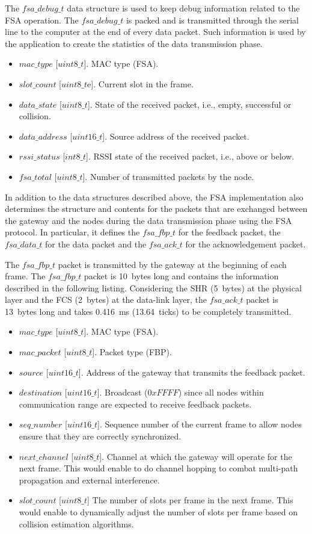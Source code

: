 The $fsa\_debug\_t$ data structure is used to keep debug information related to the FSA operation. The $fsa\_debug\_t$ is packed and is transmitted through the serial line to the computer at the end of every data packet. Such information is used by the application to create the statistics of the data transmission phase.
\begin{itemize}
\item $mac\_type$ [$uint8\_t$]. MAC type (FSA).
\item $slot\_count$ [$uint8\_t$e]. Current slot in the frame.
\item $data\_state$ [$uint8\_t$]. State of the received packet, i.e., empty, successful or collision.
\item $data\_address$ [$uint16\_t$]. Source address of the received packet.
\item $rssi\_status$ [$int8\_t$]. RSSI state of the received packet, i.e., above or below.
\item $fsa\_total$ [$uint8\_t$]. Number of transmitted packets by the node.
\end{itemize}

In addition to the data structures described above, the FSA implementation also determines the structure and contents for the packets that are exchanged between the gateway and the nodes during the data transmission phase using the FSA protocol. In particular, it defines the $fsa\_fbp\_t$ for the feedback packet, the $fsa\_data\_t$ for the data packet and the $fsa\_ack\_t$ for the acknowledgement packet.

The $fsa\_fbp\_t$ packet is transmitted by the gateway at the beginning of each frame. The $fsa\_fbp\_t$ packet is 10~bytes long and contains the information described in the following listing. Considering the SHR (5~bytes) at the physical layer and the FCS (2~bytes) at the data-link layer, the $fsa\_ack\_t$ packet is 13~bytes long and takes 0.416~ms (13.64~ticks) to be completely transmitted. 
\begin{itemize}
\item $mac\_type$ [$uint8\_t$]. MAC type (FSA).
\item $mac\_packet$ [$uint8\_t$]. Packet type (FBP).
\item $source$ [$uint16\_t$]. Address of the gateway that transmits the feedback packet.
\item $destination$ [$uint16\_t$]. Broadcast ($0xFFFF$) since all nodes within communication range are expected to receive feedback packets.
\item $seq\_number$ [$uint16\_t$]. Sequence number of the current frame to allow nodes ensure that they are correctly synchronized.
\item $next\_channel$ [$uint8\_t$]. Channel at which the gateway will operate for the next frame. This would enable to do channel hopping to combat multi-path propagation and external interference.
\item $slot\_count$ [$uint8\_t$] The number of slots per frame in the next frame. This would enable to dynamically adjust the number of slots per frame based on collision estimation algorithms.
\end{itemize}

